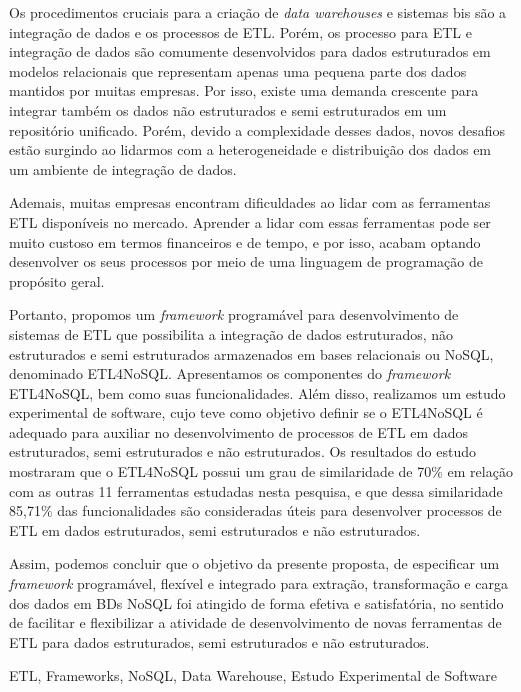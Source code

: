 
Os procedimentos cruciais para a criação de \textit{data warehouses} e sistemas \acp{bi} são a integração de dados e os processos de ETL. Porém, os processo para ETL e integração de dados são comumente desenvolvidos para dados estruturados em modelos relacionais que representam apenas uma pequena parte dos dados mantidos por muitas empresas. Por isso, existe uma demanda crescente para integrar também os dados não estruturados e semi estruturados em um repositório unificado. Porém, devido a complexidade desses dados, novos desafios estão surgindo ao lidarmos com a heterogeneidade e distribuição dos dados em um ambiente de integração de dados.

Ademais, muitas empresas encontram dificuldades ao lidar com as ferramentas ETL disponíveis no mercado. Aprender a lidar com essas ferramentas pode ser muito custoso em termos financeiros e de tempo, e por isso, acabam optando desenvolver os seus processos por meio de uma linguagem de programação de propósito geral.

Portanto, propomos um \textit{framework} programável para desenvolvimento de sistemas de ETL que possibilita a integração de dados estruturados, não estruturados e semi estruturados armazenados em bases relacionais ou NoSQL, denominado ETL4NoSQL. Apresentamos os componentes do \textit{framework} ETL4NoSQL, bem como suas funcionalidades. Além disso, realizamos um estudo experimental de software, cujo teve como objetivo definir se o ETL4NoSQL é adequado para auxiliar no desenvolvimento de processos de ETL em dados estruturados, semi estruturados e não estruturados. Os resultados do estudo mostraram que o ETL4NoSQL possui um grau de similaridade de 70\% em relação com as outras 11 ferramentas estudadas nesta pesquisa, e que dessa similaridade 85,71\% das funcionalidades são consideradas úteis para desenvolver processos de ETL em dados estruturados, semi estruturados e não estruturados. 

Assim, podemos concluir que o objetivo da presente proposta, de especificar um \textit{framework} programável, flexível e integrado para extração, transformação e carga dos dados em BDs NoSQL foi atingido de forma efetiva e satisfatória, no sentido de facilitar e flexibilizar a atividade de desenvolvimento de novas ferramentas de ETL para dados estruturados, semi estruturados e não estruturados.

\begin{keywords}
ETL, Frameworks, NoSQL, Data Warehouse, Estudo Experimental de Software
\end{keywords}